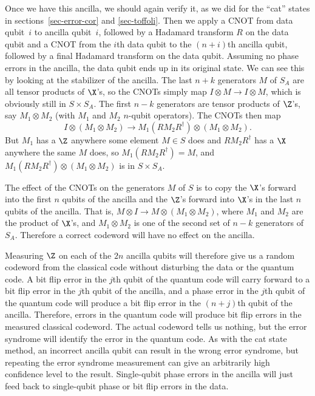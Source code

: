 Once we have this ancilla, we should again verify it, as we did for the ``cat''
states in sections~\ref{sec-error-cor} and \ref{sec-toffoli}.  Then we apply
a CNOT from data qubit~$i$ to ancilla qubit~$i$, followed by a Hadamard
transform $R$ on the data qubit and a CNOT from the $i$th data qubit to
the $(n+i)$th ancilla qubit, followed by a final Hadamard transform on the
data qubit.  Assuming no phase errors in the ancilla, the data qubit ends
up in its original state.  We can see this by looking at the stabilizer of the
ancilla.  The last $n+k$ generators $M$ of $S_A$ are all tensor products of
$\X$'s, so the CNOTs simply map $I \otimes M \rightarrow I \otimes M$,
which is obviously still in $S \times S_A$.  The first $n-k$ generators are
tensor products of $\Z$'s, say $M_1 \otimes M_2$ (with $M_1$ and $M_2$
$n$-qubit operators).  The CNOTs then map
\begin{equation}
	I \otimes (M_1 \otimes M_2) \rightarrow M_1 (R M_2 R^\dagger) \otimes
	(M_1 \otimes M_2).
\end{equation}
But $M_1$ has a $\Z$ anywhere some element $M \in S$ does and $R M_2
R^\dagger$ has a $\X$ anywhere the same $M$ does, so $M_1 (R M_2
R^\dagger) = M$, and $M_1 (R M_2 R^\dagger) \otimes (M_1 \otimes
M_2)$ is in $S \times S_A$.

The effect of the CNOTs on the generators $M$ of $S$ is to copy the $\X$'s
forward into the first $n$ qubits of the ancilla and the $\Z$'s forward into
$\X$'s in the last $n$ qubits of the ancilla.  That is, $M \otimes I
\rightarrow M \otimes (M_1 \otimes M_2)$, where $M_1$ and $M_2$ are
the product of $\X$'s, and $M_1 \otimes M_2$ is one of the second set of
$n-k$ generators of $S_A$.  Therefore a correct codeword will have no
effect on the ancilla.

Measuring $\Z$ on each of the $2n$ ancilla qubits will therefore give us a
random codeword from the classical code without disturbing the data or
the quantum code.  A bit flip error in the $j$th qubit of the quantum code
will carry forward to a bit flip error in the $j$th qubit of the ancilla, and a
phase error in the $j$th qubit of the quantum code will produce a bit flip
error in the $(n+j)$th qubit of the ancilla.  Therefore, errors in the quantum
code will produce bit flip errors in the measured classical codeword.  The
actual codeword tells us nothing, but the error syndrome will identify the
error in the quantum code.  As with the cat state method, an incorrect
ancilla qubit can result in the wrong error syndrome, but repeating the
error syndrome measurement can give an arbitrarily high confidence level
to the result.  Single-qubit phase errors in the ancilla will just feed back to
single-qubit phase or bit flip errors in the data.